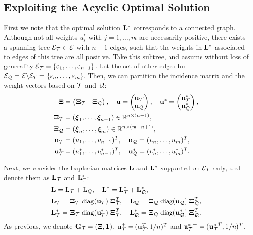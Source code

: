 \documentclass{article}
\begin{document}
\subsection{Exploiting the Acyclic Optimal Solution}
First we note that the optimal solution ${\bf L}^*$ corresponds to a connected graph. Although not all weights $u_j^*$ with $j=1,\dots,m$ are necessarily positive, there exists a spanning tree ${\cal E}_{\cal T}\subset{\cal E}$ with $n-1$ edges, such that the weights in ${\bf L}^*$ associated to edges of this tree are all positive. Take this subtree, and assume without loss of generality ${\cal E}_{\cal T}=\{\varepsilon_1,\dots,\varepsilon_{n-1}\}$. Let the set of other edges be ${\cal E}_{\cal Q}={\cal E}\backslash{\cal E}_{\cal T}=\{\varepsilon_n,\dots,\varepsilon_m\}$. Then, we can partition the incidence matrix and the weight vectors based on ${\cal T}$ and ${\cal Q}$: 
\begin{align*}
  \hbox{\boldmath$\Xi$} &= \begin{pmatrix} \hbox{\boldmath$\Xi$}_{\cal T} & \hbox{\boldmath$\Xi$}_{\cal Q} \end{pmatrix},\quad
  {\bf u} = \begin{pmatrix} {\bf u}_{\cal T} \\ {\bf u}_{\cal Q} \end{pmatrix},\quad 
  {\bf u}^* = \begin{pmatrix} {\bf u}_{\cal T}^* \\ {\bf u}_{\cal Q}^* \end{pmatrix}, \\
  \hbox{\boldmath$\Xi$}_{\cal T} &= (\hbox{\boldmath$\xi$}_1,\dots,\hbox{\boldmath$\xi$}_{n-1})\in\mathbb{R}^{n\times (n-1)}, \\
  \hbox{\boldmath$\Xi$}_{\cal Q} &= (\hbox{\boldmath$\xi$}_n,\dots,\hbox{\boldmath$\xi$}_m)\in\mathbb{R}^{n\times (m-n+1)}, \\
  {\bf u}_{\cal T} &= (u_1,\dots,u_{n-1})^T, \quad {\bf u}_{\cal Q}=(u_n,\dots,u_m)^T, \\
  {\bf u}_{\cal T}^* &= (u_1^*,\dots,u_{n-1}^*)^T, \quad {\bf u}_{\cal Q}^*=(u_n^*,\dots,u_m^*)^T.
\end{align*}

Next, we consider the Laplacian matrices ${\bf L}$ and ${\bf L}^*$ supported on ${\cal E}_{\cal T}$ only, and denote them as ${\bf L}_{\cal T}$ and ${\bf L}_{\cal T}^*$:
\begin{align*}
  & {\bf L} = {\bf L}_{\cal T}+{\bf L}_{\cal Q}, \quad {\bf L}^* = {\bf L}_{\cal T}^*+{\bf L}_{\cal Q}^*, \\
  & {\bf L}_{\cal T} = \hbox{\boldmath$\Xi$}_{\cal T}\;\text{diag}({\bf u}_{\cal T})\;\hbox{\boldmath$\Xi$}_{\cal T}^T,\quad {\bf L}_{\cal Q} = \hbox{\boldmath$\Xi$}_{\cal Q}\;\text{diag}({\bf u}_{\cal Q})\;\hbox{\boldmath$\Xi$}_{\cal Q}^T, \\
  & {\bf L}_{\cal T}^* = \hbox{\boldmath$\Xi$}_{\cal T}\;\text{diag}({\bf u}_{\cal T}^*)\;\hbox{\boldmath$\Xi$}_{\cal T}^T,\quad {\bf L}_{\cal Q}^* = \hbox{\boldmath$\Xi$}_{\cal Q}\;\text{diag}({\bf u}_{\cal Q}^*)\;\hbox{\boldmath$\Xi$}_{\cal Q}^T.
\end{align*}
As previous, we denote ${\bf G}_{\cal T}=(\hbox{\boldmath$\Xi$},{\bf 1})$, ${\bf u}_{\cal T}^+=({\bf u}_{\cal T}^T,1/n)^T$ and ${{\bf u}_{\cal T}^*}^+=({{\bf u}_{\cal T}^*}^T,1/n)^T$. 
\end{document}
